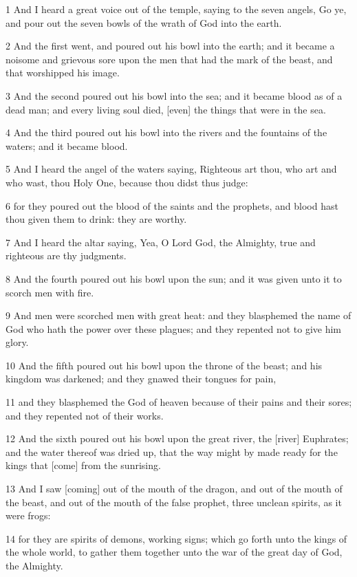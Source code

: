 \par 1 And I heard a great voice out of the temple, saying to the seven angels, Go ye, and pour out the seven bowls of the wrath of God into the earth.
\par 2 And the first went, and poured out his bowl into the earth; and it became a noisome and grievous sore upon the men that had the mark of the beast, and that worshipped his image.
\par 3 And the second poured out his bowl into the sea; and it became blood as of a dead man; and every living soul died, [even] the things that were in the sea.
\par 4 And the third poured out his bowl into the rivers and the fountains of the waters; and it became blood.
\par 5 And I heard the angel of the waters saying, Righteous art thou, who art and who wast, thou Holy One, because thou didst thus judge:
\par 6 for they poured out the blood of the saints and the prophets, and blood hast thou given them to drink: they are worthy.
\par 7 And I heard the altar saying, Yea, O Lord God, the Almighty, true and righteous are thy judgments.
\par 8 And the fourth poured out his bowl upon the sun; and it was given unto it to scorch men with fire.
\par 9 And men were scorched men with great heat: and they blasphemed the name of God who hath the power over these plagues; and they repented not to give him glory.
\par 10 And the fifth poured out his bowl upon the throne of the beast; and his kingdom was darkened; and they gnawed their tongues for pain,
\par 11 and they blasphemed the God of heaven because of their pains and their sores; and they repented not of their works.
\par 12 And the sixth poured out his bowl upon the great river, the [river] Euphrates; and the water thereof was dried up, that the way might by made ready for the kings that [come] from the sunrising.
\par 13 And I saw [coming] out of the mouth of the dragon, and out of the mouth of the beast, and out of the mouth of the false prophet, three unclean spirits, as it were frogs:
\par 14 for they are spirits of demons, working signs; which go forth unto the kings of the whole world, to gather them together unto the war of the great day of God, the Almighty.
